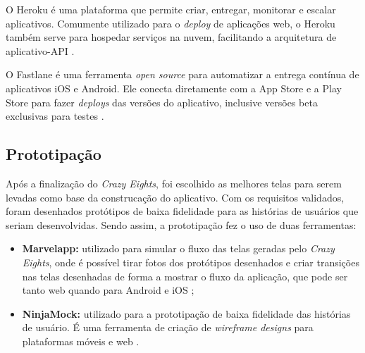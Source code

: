 O Heroku é uma plataforma que permite criar, entregar, monitorar e escalar aplicativos. Comumente utilizado para o \textit{deploy} de aplicações web, o Heroku também serve para hospedar serviços na nuvem, facilitando a arquitetura de aplicativo-API \cite{heroku}.

O Fastlane é uma ferramenta \textit{open source} para automatizar a entrega contínua de aplicativos iOS e Android. Ele conecta diretamente com a App Store e a Play Store para fazer \textit{deploys} das versões do aplicativo, inclusive versões beta exclusivas para testes \cite{fastlane}.

\subsection{Prototipação}

Após a finalização do \textit{Crazy Eights}, foi escolhido as melhores telas para serem levadas como base da construcação do aplicativo.
Com os requisitos validados, foram desenhados protótipos de baixa fidelidade para as histórias de usuários que seriam desenvolvidas.
Sendo assim, a prototipação fez o uso de duas ferramentas:
\begin{itemize}
    \item \textbf{Marvelapp:} utilizado para simular o fluxo das telas geradas pelo \textit{Crazy Eights}, onde é possível tirar fotos dos protótipos desenhados e criar transições nas telas desenhadas de forma a mostrar o fluxo da aplicação, que pode ser tanto web quando para Android e iOS \cite{marvelapp};
    \item \textbf{NinjaMock:} utilizado para a prototipação de baixa fidelidade das histórias de usuário. É uma ferramenta de criação de \textit{wireframe designs} para plataformas móveis e web \cite{ninjamock}.
\end{itemize}

